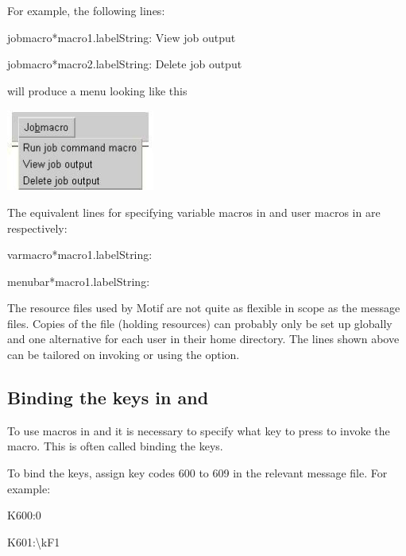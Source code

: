 For example, the following lines:

\begin{expara}

\XmbtqName*jobmacro*macro1.labelString: View job output

\XmbtqName*jobmacro*macro2.labelString: Delete job output

\end{expara}

will produce a menu looking like this

 \includegraphics[width=4.867cm,height=2.671cm]{img/ref54.jpg} 

The equivalent lines for specifying variable macros in \PrXmbtq{} and user macros in \PrXmbtuser{} are respectively:

\begin{expara}

\XmbtqName*varmacro*macro1.labelString:

\XmbtuserName*menubar*macro1.labelString:

\end{expara}

The resource files used by Motif are not quite as flexible in scope as the \ProductName{} message files. Copies of the  file
(holding \ProductName{} resources) can probably only be set up globally and one alternative for each user in their home directory. The lines shown
above can be tailored on invoking \PrXmbtq{} or \PrXmbtuser{} using the  option.

\subsection{Binding the keys in \BtqName{} and \BtuserName}
To use macros in \PrBtq{} and \PrBtuser{} it is necessary to specify what key to press to invoke the macro. This is often called binding the keys.

To bind the keys, assign key codes 600 to 609 in the relevant message file. For example:

\begin{expara}

K600:0

K601:{\textbackslash}kF1

\end{expara}

